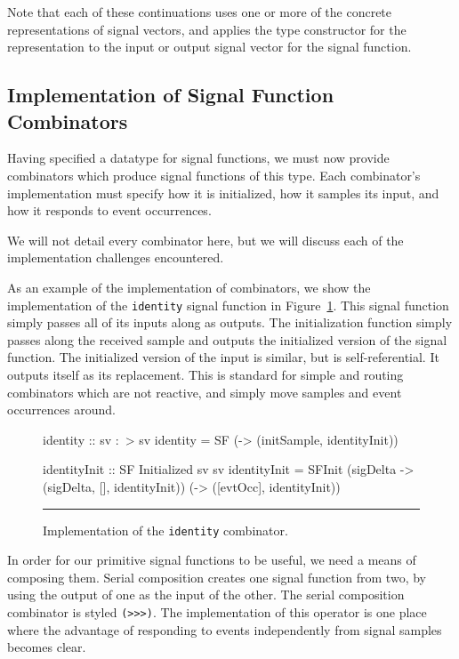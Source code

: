 Note that each of these continuations uses one or more of the concrete
representations of signal vectors, and applies the type constructor for the
representation to the input or output signal vector for the signal function.

\subsection{Implementation of Signal Function Combinators}
\label{subsection:Implementation-Signal_Functions-Implementation_of_Signal_Function_Combinators}

Having specified a datatype for signal functions, we must now provide
combinators which produce signal functions of this type. Each combinator's
implementation must specify how it is initialized, how it samples its input, and
how it responds to event occurrences.

We will not detail every combinator here, but we will discuss each of the
implementation challenges encountered.

As an example of the implementation of combinators, we show the implementation
of the {\tt identity} signal function in Figure~\ref{figure:identity_implementation}.
This signal function simply passes all of its inputs along as outputs. The
initialization function simply passes along the received sample and outputs the
initialized version of the signal function. The initialized version of the input
is similar, but is self-referential. It outputs itself as its replacement. This
is standard for simple and routing combinators which are not reactive, and
simply move samples and event occurrences around.

\begin{figure}
\begin{code}
identity :: sv :~> sv
identity =
  SF (\initSample -> (initSample, identityInit))

identityInit :: SF Initialized sv sv
identityInit =
  SFInit (\dt sigDelta -> (sigDelta, [], identityInit))
         (\evtOcc -> ([evtOcc], identityInit))
\end{code}
\hrule
\caption{Implementation of the {\tt identity} combinator.}
\label{figure:identity_implementation}
\end{figure}

In order for our primitive signal functions to be useful, we need a means of
composing them. Serial composition creates one signal function from two, by
using the output of one as the input of the other. The serial composition
combinator is styled {\tt (>>>)}. The implementation of this operator is one
place where the advantage of responding to events independently from signal
samples becomes clear. 

